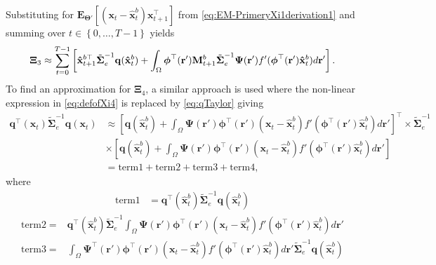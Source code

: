 \documentclass[]{article}
\begin{document}
Substituting for  $\mathbf E_{\boldsymbol\Theta'}\left[(\mathbf x_t - \mathbf  {\hat x}_t^b)\mathbf x_{t+1}^\top\right]$ from \eqref{eq:EM-PrimeryXi1derivation1} and summing over $t \in \left\lbrace 0, \dots, T-1\right\rbrace $ yields
\begin{equation}
\boldsymbol\Xi_{3}\approx\sum_{t=0}^{T-1}\left[ \mathbf{\hat x}_{t+1}^{b\top}\tilde{\boldsymbol\Sigma}_e^{-1}\mathbf q(\mathbf{\hat x}_t^b)+\int_\Omega\boldsymbol \phi^\top(\mathbf r') \mathbf M_{t+1}^b \tilde{\boldsymbol\Sigma}_e^{-1} \boldsymbol{\Psi}(\mathbf{r}') f'(\boldsymbol \phi^\top(\mathbf r')\mathbf {\hat x}_t^b) d\mathbf{r}'\right]. \label{eq:Xi3Ap} \\	
\end{equation}
To find an approximation for $\boldsymbol\Xi_4$, a similar approach is used where the non-linear expression in \eqref{eq:defofXi4} is replaced by \eqref{eq:qTaylor}  giving
\begin{align}\label{eq:Xi4derivation1}
 \mathbf q^\top(\mathbf x_t)\tilde{\boldsymbol\Sigma}_e^{-1}\mathbf q(\mathbf x_t)&\approx \left[ \mathbf q(\mathbf {\hat x}_t^b)+\int_\Omega \boldsymbol{\Psi}(\mathbf{r}')\boldsymbol \phi^\top(\mathbf r') (\mathbf x_t - \mathbf  {\hat x}_t^b)f'(\boldsymbol \phi^\top(\mathbf r')\mathbf {\hat x}_t^b) d\mathbf{r}'\right]^\top  \times \tilde{\boldsymbol\Sigma}_e^{-1}\nonumber \\
&\times\left[ \mathbf q(\mathbf {\hat x}_t^b)+\int_\Omega \boldsymbol{\Psi}(\mathbf{r}')\boldsymbol \phi^\top(\mathbf r') (\mathbf x_t - \mathbf  {\hat x}_t^b)f'(\boldsymbol \phi^\top(\mathbf r')\mathbf {\hat x}_t^b) d\mathbf{r}'\right] \nonumber \\
&= \mathrm{term1} + \mathrm{term2} + \mathrm{term3} + \mathrm{term4},
\end{align}
where
\begin{align}
  \mathrm{term1}&=\mathbf q^\top(\mathbf {\hat x}_t^b)\tilde{\boldsymbol\Sigma}_e^{-1}\mathbf q(\mathbf {\hat x}_t^b)
\end{align}
\begin{align}
\mathrm{term2}=&\mathbf q^\top(\mathbf {\hat x}_t^b)\tilde{\boldsymbol\Sigma}_e^{-1}\int_\Omega \boldsymbol{\Psi}(\mathbf{r}')\boldsymbol \phi^\top(\mathbf r') (\mathbf x_t - \mathbf  {\hat x}_t^b)f'(\boldsymbol \phi^\top(\mathbf r')\mathbf {\hat x}_t^b) d\mathbf{r}'
 \end{align}
\begin{align}
\mathrm{term3}=&\int_\Omega \boldsymbol{\Psi}^\top(\mathbf{r}')\boldsymbol \phi^\top(\mathbf r') (\mathbf x_t - \mathbf  {\hat x}_t^b)f'(\boldsymbol \phi^\top(\mathbf r')\mathbf {\hat x}_t^b) d\mathbf{r}'\tilde{\boldsymbol\Sigma}_e^{-1}\mathbf q(\mathbf {\hat x}_t^b)
\end{align}
\end{document}
